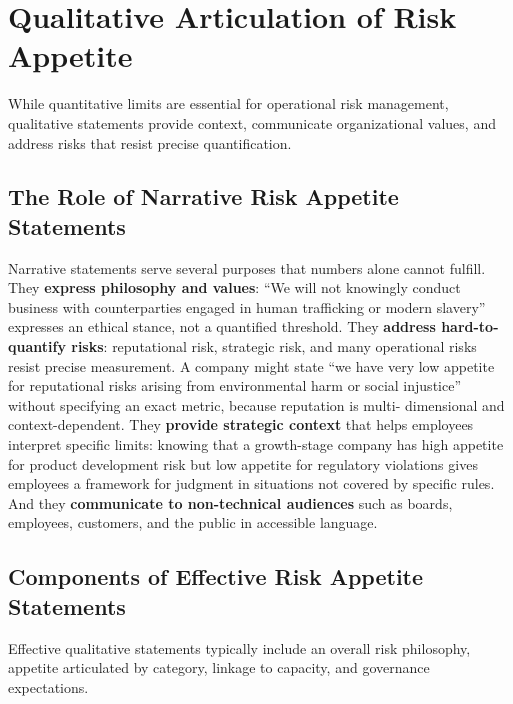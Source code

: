 \documentclass[11pt,openany]{book}
\begin{document}
\section{Qualitative Articulation of Risk Appetite}
\label{sec:qualitative-appetite}

While quantitative limits are essential for operational risk management,
qualitative statements provide context, communicate organizational values, and
address risks that resist precise quantification.

\subsection{The Role of Narrative Risk Appetite Statements}
\label{subsec:narrative-statements}

Narrative statements serve several purposes that numbers alone cannot fulfill.
They \textbf{express philosophy and values}: ``We will not knowingly conduct
business with counterparties engaged in human trafficking or modern slavery''
expresses an ethical stance, not a quantified threshold. They \textbf{address
hard-to-quantify risks}: reputational risk, strategic risk, and many operational
risks resist precise measurement. A company might state ``we have very low
appetite for reputational risks arising from environmental harm or social
injustice'' without specifying an exact metric, because reputation is multi-
dimensional and context-dependent. They \textbf{provide strategic context} that
helps employees interpret specific limits: knowing that a growth-stage company
has high appetite for product development risk but low appetite for regulatory
violations gives employees a framework for judgment in situations not covered
by specific rules. And they \textbf{communicate to non-technical audiences}
such as boards, employees, customers, and the public in accessible language.

\subsection{Components of Effective Risk Appetite Statements}
\label{subsec:appetite-statement-components}

Effective qualitative statements typically include an overall risk philosophy,
appetite articulated by category, linkage to capacity, and governance
expectations.
\end{document}
